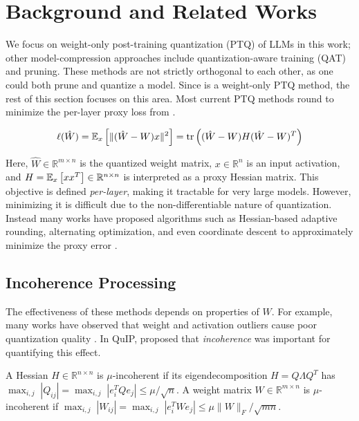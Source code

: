 \section{Background and Related Works}

We focus on weight-only post-training quantization (PTQ) of LLMs in this work; other model-compression approaches include quantization-aware training (QAT) and pruning.
These methods are not strictly orthogonal to each other, as one could both prune and quantize a model.
Since \qts is a weight-only PTQ method, the rest of this section focuses on this area.
Most current \sota PTQ methods round to minimize the per-layer proxy loss from \citet{nagelround}.

\vspace{-0.15cm}
\begin{equation}
\label{eqn:proxy}
\ell(\hat W) = \mathbb{E}_{x}\left[\|(\hat W - W)x\|^2\right] = \operatorname{tr}\left((\hat W - W) H (\hat W - W)^T\right)
\end{equation}

Here, $\hat W \in \mathbb{R}^{m \times n}$ is the quantized weight matrix, $x \in \mathbb{R}^n$ is an input activation, and $H = \mathbb{E}_{x}\left[xx^T\right] \in \mathbb{R}^{n\times n}$ is interpreted as a proxy Hessian matrix.
This objective is defined \textit{per-layer}, making it tractable for very large models.
However, minimizing it is difficult due to the non-differentiable nature of quantization.
Instead many works have proposed algorithms such as Hessian-based adaptive rounding, alternating optimization, and even coordinate descent to approximately minimize the proxy error \cite{aqlm,chee2023quip,tseng2024quip,optq}.

\subsection{Incoherence Processing}

The effectiveness of these methods depends on properties of $W$.
For example, many works have observed that weight and activation outliers cause poor quantization quality \cite{dettmers2022llmint8,awq,omniquant}.
In QuIP, \citet{chee2023quip} proposed that \textit{incoherence} was important for quantifying this effect.

\begin{definition}
A Hessian $H \in \mathbb{R}^{n \times n}$ is $\mu$-incoherent if its eigendecomposition $H = Q \Lambda Q^T$ has $\max_{i,j} \; |Q_{ij}| = \max_{i,j} \; |e_i^T Q e_j| \leq \mu / \sqrt{n}$. 
A weight matrix $W \in \mathbb{R}^{m \times n}$ is $\mu$-incoherent if $\max_{i,j} \; \textstyle |W_{ij}| = \max_{i,j} \; |e_i^T W e_j| \leq \mu \|W\|_F / \sqrt{mn}$.
\end{definition}

